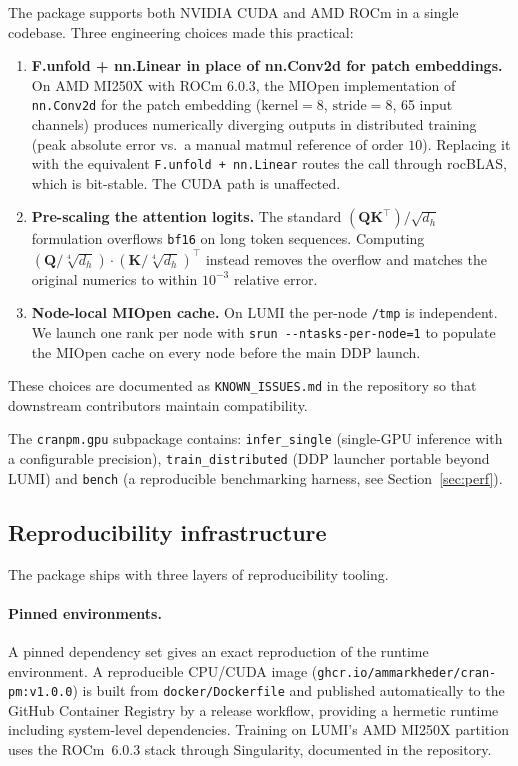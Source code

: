 The package supports both NVIDIA CUDA and AMD ROCm in a single
codebase. Three engineering choices made this practical:
\begin{enumerate}
\item \textbf{F.unfold + nn.Linear in place of nn.Conv2d for patch
embeddings.} On AMD MI250X with ROCm 6.0.3, the MIOpen
implementation of \texttt{nn.Conv2d} for the patch embedding
($\text{kernel}=8$, $\text{stride}=8$, 65 input channels) produces
numerically diverging outputs in distributed training (peak
absolute error vs.\ a manual matmul reference of order $10$).
Replacing it with the equivalent \texttt{F.unfold + nn.Linear}
routes the call through rocBLAS, which is bit-stable. The CUDA
path is unaffected.
\item \textbf{Pre-scaling the attention logits.} The standard
$(\mathbf{Q} \mathbf{K}^\top) / \sqrt{d_h}$ formulation overflows
\texttt{bf16} on long token sequences. Computing
$(\mathbf{Q} / \sqrt[4]{d_h}) \cdot (\mathbf{K} /
\sqrt[4]{d_h})^\top$ instead removes the overflow and matches
the original numerics to within $10^{-3}$ relative error.
\item \textbf{Node-local MIOpen cache.} On LUMI the per-node
\texttt{/tmp} is independent. We launch one rank per node with
\texttt{srun -{}-ntasks-per-node=1} to populate the MIOpen cache on
every node before the main DDP launch.
\end{enumerate}
These choices are documented as \texttt{KNOWN\_ISSUES.md} in the
repository so that downstream contributors maintain compatibility.

The \texttt{cranpm.gpu} subpackage contains:
\texttt{infer\_single} (single-GPU inference with a configurable
precision), \texttt{train\_distributed} (DDP launcher portable
beyond LUMI) and \texttt{bench} (a reproducible benchmarking
harness, see Section~\ref{sec:perf}).

\subsection{Reproducibility infrastructure}
\label{sec:soft:repro}

The package ships with three layers of reproducibility tooling.

\paragraph{Pinned environments.}
A pinned dependency set gives an exact reproduction of the runtime
environment. A reproducible CPU/CUDA image
(\texttt{ghcr.io/ammarkheder/cran-pm:v1.0.0}) is built from
\texttt{docker/Dockerfile} and published automatically to the GitHub
Container Registry by a release workflow, providing a hermetic runtime
including system-level dependencies. Training on LUMI's AMD MI250X
partition uses the ROCm~6.0.3 stack through Singularity, documented in
the repository.

